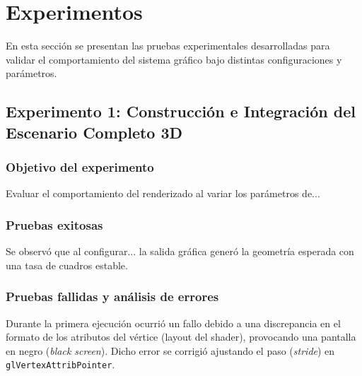 
\section{Experimentos}

En esta sección se presentan las pruebas experimentales desarrolladas para validar el comportamiento del sistema gráfico bajo distintas configuraciones y parámetros.

\subsection{Experimento 1: Construcción e Integración del Escenario Completo 3D}
\subsubsection{Objetivo del experimento}
Evaluar el comportamiento del renderizado al variar los parámetros de...

\subsubsection{Pruebas exitosas}
Se observó que al configurar... la salida gráfica generó la geometría esperada con una tasa de cuadros estable.

\subsubsection{Pruebas fallidas y análisis de errores}
Durante la primera ejecución ocurrió un fallo debido a una discrepancia en el formato de los atributos del vértice (layout del shader), provocando una pantalla en negro (\textit{black screen}). Dicho error se corrigió ajustando el paso (\textit{stride}) en \texttt{glVertexAttribPointer}.

